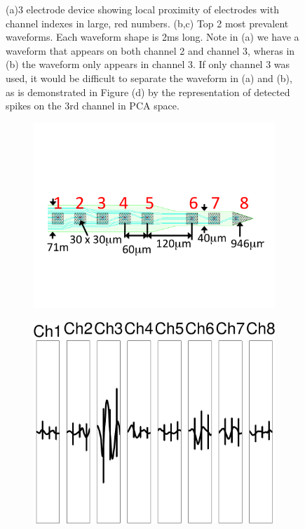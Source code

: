 \begin{center}
\begin{figure}
\begin{subfigure}[b]{.24\textwidth}
\caption{}
\label{3chpca}
\end{subfigure}
\caption{(a)3 electrode device showing local proximity of electrodes with channel indexes in large, red numbers. (b,c) Top 2 most prevalent waveforms.  Each waveform shape is 2ms long.   Note in (a) we have a waveform that appears on both channel 2 and channel 3, wheras in (b) the waveform only appears in channel 3.  If only channel 3 was used, it would be difficult to separate the waveform in (a) and (b), as is demonstrated in Figure (d) by the representation of detected spikes on the 3rd channel in PCA space.}
\end{figure}
\end{center}
\begin{center}
\begin{figure}
\begin{subfigure}[b]{.24\textwidth}
\includegraphics[width=\textwidth]{../figs/8dev}
\caption{}
\label{3dev}
\end{subfigure}
\begin{subfigure}[b]{.24\textwidth}
\includegraphics[width=\textwidth]{../figs/8devim/clus3}

\end{subfigure}
\end{figure}
\end{center}
